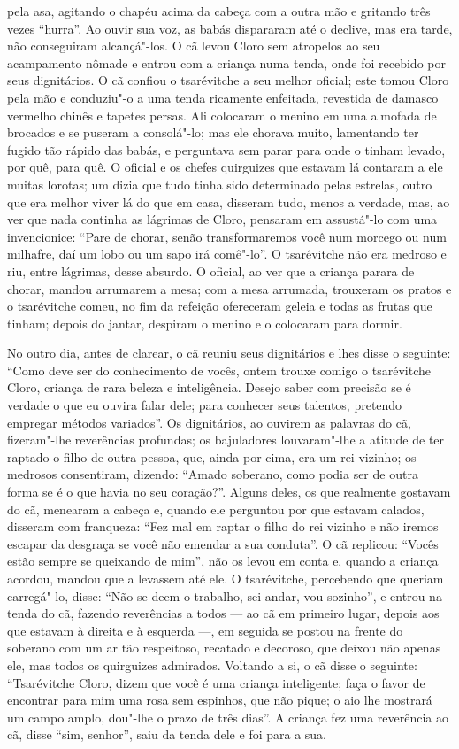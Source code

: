 pela asa, agitando o chapéu acima da cabeça com a outra mão e gritando
três vezes ``hurra''. Ao ouvir sua voz, as babás dispararam até o
declive, mas era tarde, não conseguiram alcançá"-los. O cã levou Cloro
sem atropelos ao seu acampamento nômade e entrou com a criança numa
tenda, onde foi recebido por seus dignitários. O cã confiou o
tsarévitche a seu melhor oficial; este tomou Cloro pela mão e conduziu"-o
a uma tenda ricamente enfeitada, revestida de damasco vermelho chinês e
tapetes persas. Ali colocaram o menino em uma almofada de brocados e se
puseram a consolá"-lo; mas ele chorava muito, lamentando ter fugido tão
rápido das babás, e perguntava sem parar para onde o tinham levado, por
quê, para quê. O oficial e os chefes quirguizes que estavam lá contaram
a ele muitas lorotas; um dizia que tudo tinha sido determinado pelas
estrelas, outro que era melhor viver lá do que em casa, disseram tudo,
menos a verdade, mas, ao ver que nada continha as lágrimas de Cloro,
pensaram em assustá"-lo com uma invencionice: ``Pare de chorar, senão
transformaremos você num morcego ou num milhafre, daí um lobo ou um sapo
irá comê"-lo''. O tsarévitche não era medroso e riu, entre lágrimas,
desse absurdo. O oficial, ao ver que a criança parara de chorar, mandou
arrumarem a mesa; com a mesa arrumada, trouxeram os pratos e o
tsarévitche comeu, no fim da refeição ofereceram geleia e todas as
frutas que tinham; depois do jantar, despiram o menino e o colocaram
para dormir.

No outro dia, antes de clarear, o cã reuniu seus dignitários e lhes
disse o seguinte: ``Como deve ser do conhecimento de vocês, ontem trouxe
comigo o tsarévitche Cloro, criança de rara beleza e inteligência.
Desejo saber com precisão se é verdade o que eu ouvira falar dele; para
conhecer seus talentos, pretendo empregar métodos variados''. Os
dignitários, ao ouvirem as palavras do cã, fizeram"-lhe reverências
profundas; os bajuladores louvaram"-lhe a atitude de ter raptado o filho
de outra pessoa, que, ainda por cima, era um rei vizinho; os medrosos
consentiram, dizendo: ``Amado soberano, como podia ser de outra forma se
é o que havia no seu coração?''. Alguns deles, os que realmente gostavam
do cã, menearam a cabeça e, quando ele perguntou por que estavam
calados, disseram com franqueza: ``Fez mal em raptar o filho do rei
vizinho e não iremos escapar da desgraça se você não emendar a sua
conduta''. O cã replicou: ``Vocês estão sempre se queixando de mim'',
não os levou em conta e, quando a criança acordou, mandou que a levassem
até ele. O tsarévitche, percebendo que queriam carregá"-lo, disse: ``Não
se deem o trabalho, sei andar, vou sozinho'', e entrou na tenda do cã,
fazendo reverências a todos --- ao cã em primeiro lugar, depois aos que
estavam à direita e à esquerda ---, em seguida se postou na frente do
soberano com um ar tão respeitoso, recatado e decoroso, que deixou não
apenas ele, mas todos os quirguizes admirados. Voltando a si, o cã disse
o seguinte: ``Tsarévitche Cloro, dizem que você é uma criança
inteligente; faça o favor de encontrar para mim uma rosa sem espinhos,
que não pique; o aio lhe mostrará um campo amplo, dou"-lhe o prazo de
três dias''. A criança fez uma reverência ao cã, disse ``sim, senhor'',
saiu da tenda dele e foi para a sua.


